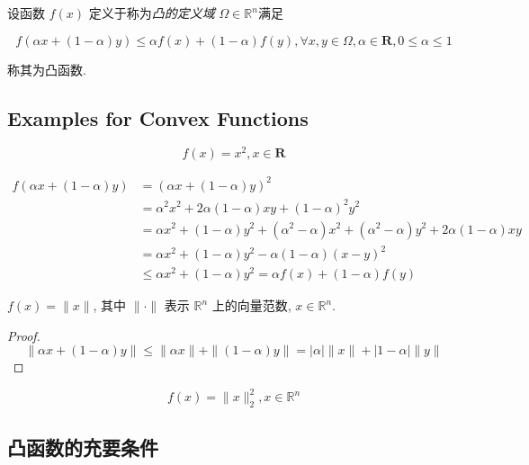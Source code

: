 \begin{definition}[凸函数]
    设函数 $ f(x) $ 定义于称为\textit{凸的定义域} $ \Omega \in \mathbb{R}^{n} $满足

    $$ f(\alpha x+(1-\alpha) y) \leq \alpha f(x)+(1-\alpha) f(y), \forall x, y \in \Omega, \alpha \in \mathbf{R}, 0 \leq \alpha \leq 1 $$

    称其为凸函数. 
\end{definition}

\subsection{Examples for Convex Functions}

\begin{example}
    \label{Example:SquareIsConvex}
    $$ f(x)=x^{2}, x \in \mathbf{R} $$

    $$ \begin{aligned} f(\alpha x+(1-\alpha) y) &=(\alpha x+(1-\alpha) y)^{2} 
    \\ &=\alpha^{2} x^{2}+2 \alpha(1-\alpha) x y+(1-\alpha)^{2} y^{2} 
    \\ &=\alpha x^{2}+(1-\alpha) y^{2}+\left(\alpha^{2}-\alpha\right) x^{2}+\left(\alpha^{2}-\alpha\right) y^{2}+2 \alpha(1-\alpha) x y 
    \\ &=\alpha x^{2}+(1-\alpha) y^{2}-\alpha(1-\alpha)(x-y)^{2}
    \\ &\leq \alpha x^{2}+(1-\alpha) y^{2}=\alpha f(x)+(1-\alpha) f(y)
    \end{aligned} $$
\end{example}

\begin{example}
    \label{Example:NormIsConvex}
    $ f(x)=\|x\| $, 其中 $ \|  \cdot \| $ 表示 $ \mathbb{R}^{n} $ 上的向量范数, $ x \in \mathbb{R}^{n} $.
\end{example}

\begin{proof}
    \label{Example:L2NormIsConvex}
    $$ \|\alpha x+(1-\alpha) y\| \leq\|\alpha x\|+\|(1-\alpha) y\|=|\alpha|\|x\|+|1-\alpha|\|y\| $$
\end{proof}

\begin{example}
    $$ f(x)=\|x\|_{2}^{2}, x \in \mathbb{R}^{n} $$
\end{example}

\subsection{凸函数的充要条件}

